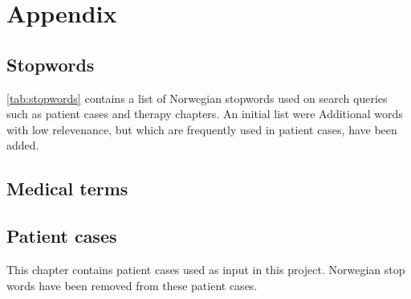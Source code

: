 \documentclass[11pt,a4paper]{report}
\begin{document}


\setcounter{tocdepth}{1} %
\clearpage
{}
{}
\listoftables


\clearpage
{}








%


\appendix
\chapter{Appendix}
\label{appendix}


\section{Stopwords}
\autoref{tab:stopwords} contains a list of Norwegian stopwords used on search
queries such as patient cases and therapy chapters.
An initial list were %
Additional words with low relevenance, but which are frequently used in
patient cases, have been added.


\section{Medical terms}


\section{Patient cases}
This chapter contains patient cases used as input in this project.
Norwegian stop words have been removed from these patient cases.





\end{document}
